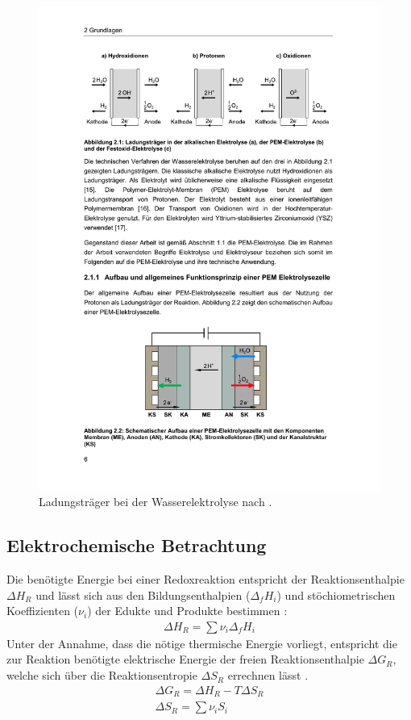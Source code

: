 \begin{figure}[h]
	\centering
		\includegraphics[scale=1]{Figures/LadungstraegerBeiDerWasserelektrolyse}
		\caption{Ladungsträger bei der 
		Wasserelektrolyse nach \citet{tjarks_pem-elektrolyse-systeme_2017}.}
\label{fig:LadungstraegerBeiDerWasserelektrolyse}	
\end{figure}

\subsection{Elektrochemische Betrachtung}
\label{subsec:Elektrochemische Betrachtung}
Die benötigte Energie bei einer Redoxreaktion entspricht der Reaktionsenthalpie $\Delta H_R$ und lässt sich aus den Bildungsenthalpien ($\Delta_f H_i$) und stöchiometrischen Koeffizienten ($\nu_i$) der Edukte und Produkte bestimmen \citep{falcao_review_2020,brauns_alkaline_2020}:
\begin{align}
 	\Delta H_R = \sum{\nu_i \Delta_f H_i}
\end{align}
Unter der Annahme, dass die nötige thermische Energie vorliegt, entspricht die zur Reaktion benötigte elektrische Energie  der freien Reaktionsenthalpie $\Delta G_R$, welche sich über die Reaktionsentropie $\Delta S_R$ errechnen lässt \citep{falcao_review_2020,brauns_alkaline_2020}.
\begin{align}
	\Delta G_R = \Delta H_R - T\Delta S_R \\
 	\Delta S_R = \sum{\nu_i S_i}
\end{align}

